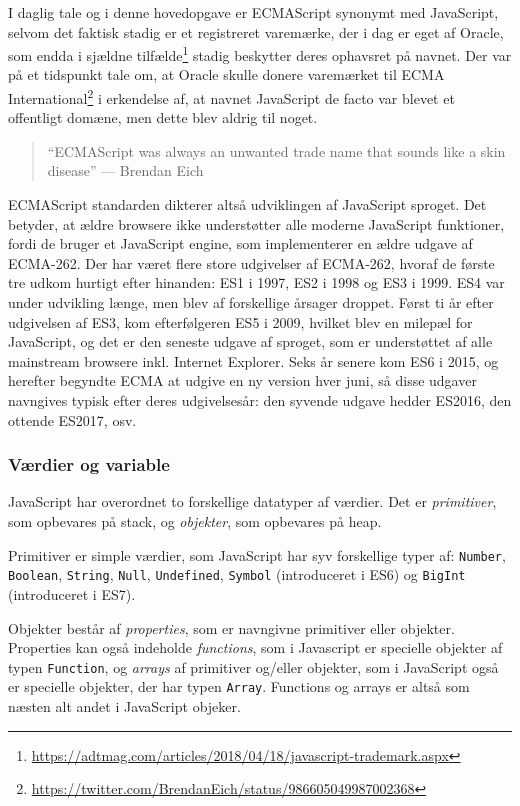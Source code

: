 \documentclass[]{article}
\begin{document}
I daglig tale og i denne hovedopgave er ECMAScript synonymt med
JavaScript, selvom det faktisk stadig er et registreret varemærke, der i
dag er eget af Oracle, som endda i sjældne tilfælde\footnote{\url{https://adtmag.com/articles/2018/04/18/javascript-trademark.aspx}}
stadig beskytter deres ophavsret på navnet. Der var på et tidspunkt tale
om, at Oracle skulle donere varemærket til ECMA International\footnote{\url{https://twitter.com/BrendanEich/status/986605049987002368}}
i erkendelse af, at navnet JavaScript de facto var blevet et offentligt
domæne, men dette blev aldrig til noget.

\begin{quote}
``ECMAScript was always an unwanted trade name that sounds like a skin
disease'' --- Brendan Eich
\end{quote}

ECMAScript standarden dikterer altså udviklingen af JavaScript sproget.
Det betyder, at ældre browsere ikke understøtter alle moderne JavaScript
funktioner, fordi de bruger et JavaScript engine, som implementerer en
ældre udgave af ECMA-262. Der har været flere store udgivelser af
ECMA-262, hvoraf de første tre udkom hurtigt efter hinanden: ES1 i 1997,
ES2 i 1998 og ES3 i 1999. ES4 var under udvikling længe, men blev af
forskellige årsager droppet. Først ti år efter udgivelsen af ES3, kom
efterfølgeren ES5 i 2009, hvilket blev en milepæl for JavaScript, og det
er den seneste udgave af sproget, som er understøttet af alle mainstream
browsere inkl. Internet Explorer. Seks år senere kom ES6 i 2015, og
herefter begyndte ECMA at udgive en ny version hver juni, så disse
udgaver navngives typisk efter deres udgivelsesår: den syvende udgave
hedder ES2016, den ottende ES2017, osv.

\hypertarget{vuxe6rdier-og-variable}{%
\subsubsection{Værdier og variable}\label{vuxe6rdier-og-variable}}

JavaScript har overordnet to forskellige datatyper af værdier. Det er
\emph{primitiver}, som opbevares på stack, og \emph{objekter}, som
opbevares på heap.

Primitiver er simple værdier, som JavaScript har syv forskellige typer
af: \texttt{Number}, \texttt{Boolean}, \texttt{String}, \texttt{Null},
\texttt{Undefined}, \texttt{Symbol} (introduceret i ES6) og
\texttt{BigInt} (introduceret i ES7).

Objekter består af \emph{properties}, som er navngivne primitiver eller
objekter. Properties kan også indeholde \emph{functions}, som i
Javascript er specielle objekter af typen \texttt{Function}, og
\emph{arrays} af primitiver og/eller objekter, som i JavaScript også er
specielle objekter, der har typen \texttt{Array}. Functions og arrays er
altså som næsten alt andet i JavaScript objeker.
\end{document}
